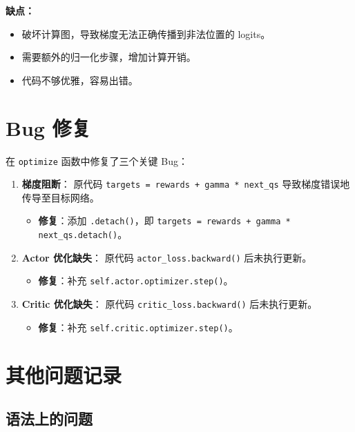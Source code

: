 \documentclass[oneside]{ctexbook}
\begin{document}
\textbf{缺点：}
\begin{itemize}
    \item 破坏计算图，导致梯度无法正确传播到非法位置的 logits。
    \item 需要额外的归一化步骤，增加计算开销。
    \item 代码不够优雅，容易出错。
\end{itemize}

\chapter{Bug 修复} \label{chap:bug_fixes}

在 \texttt{optimize} 函数中修复了三个关键 Bug：

\begin{enumerate}
    \item \textbf{梯度阻断}：
    原代码 \texttt{targets = rewards + gamma * next\_qs} 导致梯度错误地传导至目标网络。
    \begin{itemize}
        \item \textbf{修复}：添加 \texttt{.detach()}，即 \texttt{targets = rewards + gamma * next\_qs.detach()}。
    \end{itemize}
    
    \item \textbf{Actor 优化缺失}：
    原代码 \texttt{actor\_loss.backward()} 后未执行更新。
    \begin{itemize}
        \item \textbf{修复}：补充 \texttt{self.actor.optimizer.step()}。
    \end{itemize}
    
    \item \textbf{Critic 优化缺失}：
    原代码 \texttt{critic\_loss.backward()} 后未执行更新。
    \begin{itemize}
        \item \textbf{修复}：补充 \texttt{self.critic.optimizer.step()}。
    \end{itemize}
\end{enumerate}

\chapter{其他问题记录}

\section{语法上的问题} \label{sec:syntax_issues}
\end{document}
